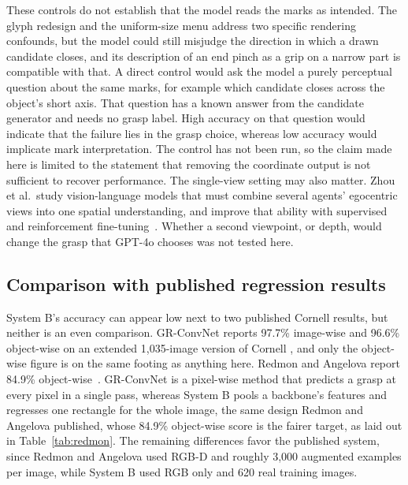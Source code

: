 \documentclass[12pt,letterpaper]{article}
\begin{document}
These controls do not establish that the model reads the marks as
intended. The glyph redesign and the uniform-size menu address two
specific rendering confounds, but the model could still misjudge the
direction in which a drawn candidate closes, and its description of an
end pinch as a grip on a narrow part is compatible with that. A direct
control would ask the model a purely perceptual question about the same
marks, for example which candidate closes across the object's short
axis. That question has a known answer from the candidate generator and
needs no grasp label. High accuracy on that question would indicate that
the failure lies in the grasp choice, whereas low accuracy would
implicate mark interpretation. The control has not been run, so the
claim made here is limited to the statement that removing the coordinate
output is not sufficient to recover performance. The single-view setting
may also matter. Zhou et al.\ study vision-language models that must
combine several agents' egocentric views into one spatial understanding,
and improve that ability with supervised and reinforcement
fine-tuning~\cite{zhou2026}. Whether a second viewpoint, or depth, would
change the grasp that GPT-4o chooses was not tested here.

\subsection{Comparison with published regression results}

System B's accuracy can appear low next to two published Cornell
results, but neither is an even comparison. GR-ConvNet reports 97.7\% image-wise
and 96.6\% object-wise on an extended 1,035-image version of Cornell
\cite{kumra2020}, and only the object-wise figure is on the same
footing as anything here. Redmon and Angelova report 84.9\%
object-wise~\cite{redmon2015}. GR-ConvNet is a pixel-wise method that predicts a grasp at every pixel in a single pass, whereas System B pools a backbone's features and regresses one rectangle for the whole
image, the same design Redmon and Angelova published, whose 84.9\%
object-wise score is the fairer target, as laid out in
Table~\ref{tab:redmon}. The remaining differences favor the published system, since Redmon and Angelova used RGB-D and roughly 3,000 augmented examples per
image, while System B used RGB only and 620 real training images.
\end{document}
